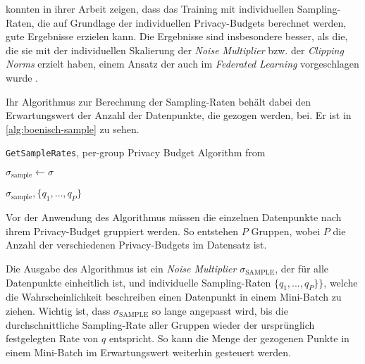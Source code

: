 \textcite{boenisch:2023} konnten in ihrer Arbeit zeigen, dass das Training mit individuellen Sampling-Raten, die auf Grundlage der individuellen Privacy-Budgets berechnet werden, gute Ergebnisse erzielen kann. Die Ergebnisse sind insbesondere besser, als die, die sie mit der individuellen Skalierung der \textit{Noise Multiplier} bzw. der \textit{Clipping Norms} erzielt haben, einem Ansatz der auch im \textit{Federated Learning} vorgeschlagen wurde \cite{aldaghri:2023}. 

Ihr Algorithmus zur Berechnung der Sampling-Raten behält dabei den Erwartungswert der Anzahl der Datenpunkte, die gezogen werden, bei. Er ist in \autoref{alg:boenisch-sample} zu sehen.

\begin{algorithm}[tb]
	\caption{\texttt{GetSampleRates}, per-group Privacy Budget Algorithm from \cite[p.6]{boenisch:2023}}
	\label{alg:boenisch-sample}
	
	
	\BlankLine
	$\sigma_\text{sample} \leftarrow \sigma$
	
	\KwRet $\sigma_\text{sample}, \{q_1, \dots, q_P\}$\;
\end{algorithm}

Vor der Anwendung des Algorithmus müssen die einzelnen Datenpunkte nach ihrem Privacy-Budget gruppiert werden. So entstehen $P$ Gruppen, wobei $P$ die Anzahl der verschiedenen Privacy-Budgets im Datensatz ist.

Die Ausgabe des Algorithmus ist ein \textit{Noise Multiplier} $\sigma_{\text{SAMPLE}}$, der für alle Datenpunkte einheitlich ist, und individuelle Sampling-Raten $\{q_1, ..., q_P\}\}$, welche die Wahrscheinlichkeit beschreiben einen Datenpunkt in einem Mini-Batch zu ziehen. Wichtig ist, dass $\sigma_{\text{SAMPLE}}$ so lange angepasst wird, bis die durchschnittliche Sampling-Rate aller Gruppen wieder der ursprünglich festgelegten Rate von $q$ entspricht. So kann die Menge der gezogenen Punkte in einem Mini-Batch im Erwartungswert weiterhin gesteuert werden.

